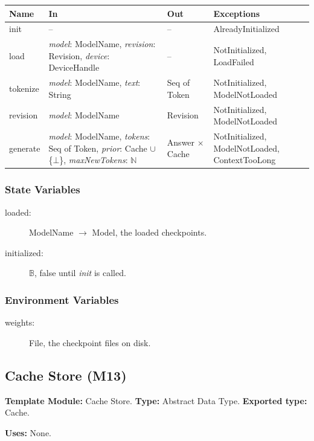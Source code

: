 \documentclass[12pt, titlepage]{article}
\begin{document}
\begin{tabularx}{\textwidth}{l X l X}
\toprule
\textbf{Name} & \textbf{In} & \textbf{Out} & \textbf{Exceptions}\\
\midrule
init & -- & -- & AlreadyInitialized\\
load & \emph{model}: ModelName, \emph{revision}: Revision, \emph{device}: DeviceHandle & -- & NotInitialized, LoadFailed\\
tokenize & \emph{model}: ModelName, \emph{text}: String & Seq of Token & NotInitialized, ModelNotLoaded\\
revision & \emph{model}: ModelName & Revision & NotInitialized, ModelNotLoaded\\
generate & \emph{model}: ModelName, \emph{tokens}: Seq of Token, \emph{prior}: Cache $\cup$ \{$\bot$\}, \emph{maxNewTokens}: $\mathbb{N}$ & Answer $\times$ Cache & NotInitialized, ModelNotLoaded, ContextTooLong\\
\bottomrule
\end{tabularx}

\subsubsection*{State Variables}

\begin{description}
\item[loaded:] ModelName $\to$ Model, the loaded checkpoints.
\item[initialized:] $\mathbb{B}$, false until \emph{init} is called.
\end{description}

\subsubsection*{Environment Variables}

\begin{description}
\item[weights:] File, the checkpoint files on disk.
\end{description}

\newpage
\subsection{Cache Store (M13)}\label{mCache}

\textbf{Template Module:} Cache Store. \textbf{Type:} Abstract Data Type. \textbf{Exported type:} Cache.

\textbf{Uses:} None.
\end{document}
